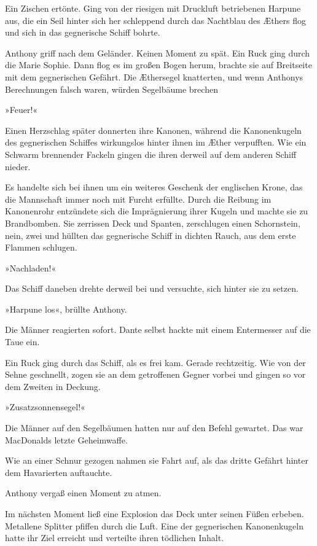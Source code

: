 Ein Zischen ertönte. Ging von der riesigen mit Druckluft
betriebenen Harpune aus, die ein Seil hinter sich her schleppend
durch das Nachtblau des Æthers flog und sich in das gegnerische
Schiff bohrte.

Anthony griff nach dem Geländer. Keinen Moment zu spät. Ein Ruck
ging durch die Marie Sophie. Dann flog es im großen Bogen herum,
brachte sie auf Breitseite mit dem gegnerischen Gefährt. Die
Æthersegel knatterten, und wenn Anthonys Berechnungen falsch waren,
würden Segelbäume brechen

»Feuer!«

Einen Herzschlag später donnerten ihre Kanonen, während die
Kanonenkugeln des gegnerischen Schiffes wirkungslos hinter ihnen im
Æther verpufften. Wie ein Schwarm brennender Fackeln gingen die
ihren derweil auf dem anderen Schiff nieder.

Es handelte sich bei ihnen um ein weiteres Geschenk der englischen
Krone, das die Mannschaft immer noch mit Furcht erfüllte. Durch die
Reibung im Kanonenrohr entzündete sich die Imprägnierung ihrer
Kugeln und machte sie zu Brandbomben. Sie zerrissen Deck und
Spanten, zerschlugen einen Schornstein, nein, zwei und hüllten das
gegnerische Schiff in dichten Rauch, aus dem erste Flammen
schlugen.

»Nachladen!«

Das Schiff daneben drehte derweil bei und versuchte, sich hinter
sie zu setzen.

»Harpune los«, brüllte Anthony.

Die Männer reagierten sofort. Dante selbst hackte mit einem
Entermesser auf die Taue ein.

Ein Ruck ging durch das Schiff, als es frei kam. Gerade
rechtzeitig. Wie von der Sehne geschnellt, zogen sie an dem
getroffenen Gegner vorbei und gingen so vor dem Zweiten in
Deckung.

»Zusatzsonnensegel!«

Die Männer auf den Segelbäumen hatten nur auf den Befehl gewartet.
Das war MacDonalds letzte Geheimwaffe.

Wie an einer Schnur gezogen nahmen sie Fahrt auf, als das dritte
Gefährt hinter dem Havarierten auftauchte.

Anthony vergaß einen Moment zu atmen.

Im nächsten Moment ließ eine Explosion das Deck unter seinen Füßen
erbeben. Metallene Splitter pfiffen durch die Luft. Eine der
gegnerischen Kanonenkugeln hatte ihr Ziel erreicht und verteilte
ihren tödlichen Inhalt.

